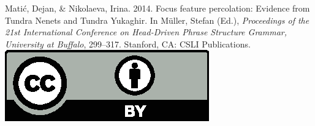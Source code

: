 \documentclass[11pt,a4paper,fleqn]{article}
\begin{document}
\noindent



\vfill
\noindent
Matić, Dejan, \& Nikolaeva, Irina. 2014. Focus feature
percolation: Evidence from Tundra Nenets and Tundra Yukaghir. In Müller, Stefan (Ed.), \emph{{Proceedings of the 21st International Conference on Head-Driven Phrase Structure Grammar, University at Buffalo}}, 299--317. Stanford,
CA: CSLI Publications. \hfill\href{http://creativecommons.org/licenses/by/4.0/}{\includegraphics[height=.75em]{Includes/ccby.eps}}

\newpage

\end{document}
